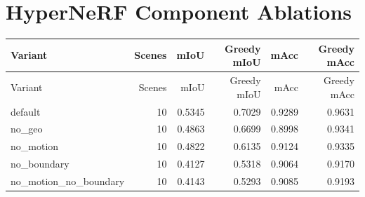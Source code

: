 \documentclass[10pt]{article}
\begin{document}
\section{HyperNeRF Component Ablations}
\small
\begin{longtable}{lrrrrr}
\toprule
Variant & Scenes & mIoU & Greedy mIoU & mAcc & Greedy mAcc \\
\midrule
\endfirsthead
\toprule
Variant & Scenes & mIoU & Greedy mIoU & mAcc & Greedy mAcc \\
\midrule
\endhead
default & 10 & 0.5345 & 0.7029 & 0.9289 & 0.9631 \\
no\_geo & 10 & 0.4863 & 0.6699 & 0.8998 & 0.9341 \\
no\_motion & 10 & 0.4822 & 0.6135 & 0.9124 & 0.9335 \\
no\_boundary & 10 & 0.4127 & 0.5318 & 0.9064 & 0.9170 \\
no\_motion\_no\_boundary & 10 & 0.4143 & 0.5293 & 0.9085 & 0.9193 \\
\bottomrule
\end{longtable}
\normalsize
\end{document}
